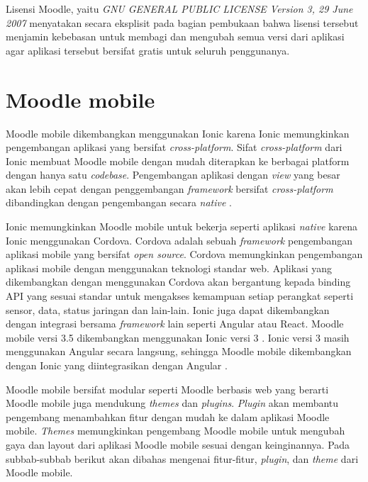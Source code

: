 Lisensi Moodle, yaitu \textit{GNU GENERAL PUBLIC LICENSE Version 3, 29 June 2007} menyatakan secara eksplisit pada bagian pembukaan bahwa lisensi tersebut menjamin kebebasan untuk membagi dan mengubah semua versi dari aplikasi agar aplikasi tersebut bersifat gratis untuk seluruh penggunanya\cite{GNU:preamble}.
\section{Moodle mobile}
\label{sec:Moodle mobile}
Moodle mobile dikembangkan menggunakan Ionic karena Ionic memungkinkan pengembangan aplikasi yang bersifat \textit{cross-platform}\cite{Ionic:intro}. Sifat \textit{cross-platform} dari Ionic membuat Moodle mobile dengan mudah diterapkan ke berbagai platform dengan hanya satu \textit{codebase}. Pengembangan aplikasi dengan \textit{view} yang besar akan lebih cepat dengan penggembangan \textit{framework} bersifat \textit{cross-platform} dibandingkan dengan pengembangan secara \textit{native} \cite{cross-platform}. 

Ionic memungkinkan Moodle mobile untuk bekerja seperti aplikasi \textit{native} karena Ionic menggunakan Cordova. Cordova adalah sebuah \textit{framework} pengembangan aplikasi mobile yang bersifat \textit{open source}. Cordova memungkinkan pengembangan aplikasi mobile dengan menggunakan teknologi standar web. Aplikasi yang dikembangkan dengan menggunakan Cordova akan bergantung kepada binding API yang sesuai standar untuk mengakses kemampuan setiap perangkat seperti sensor, data, status jaringan dan lain-lain\cite{cordova:overview}. Ionic juga dapat dikembangkan dengan integrasi bersama \textit{framework} lain seperti Angular atau React. Moodle mobile versi 3.5 dikembangkan menggunakan Ionic versi 3 \cite{moodle:dev}. Ionic versi 3 masih menggunakan Angular secara langsung, sehingga Moodle mobile dikembangkan dengan Ionic yang diintegrasikan dengan Angular \cite{moodle:dev}.


Moodle mobile bersifat modular seperti Moodle berbasis web yang berarti Moodle mobile juga mendukung \textit{themes} dan \textit{plugins}. \textit{Plugin} akan membantu pengembang menambahkan fitur dengan mudah ke dalam aplikasi Moodle mobile. \textit{Themes} memungkinkan pengembang Moodle mobile untuk mengubah gaya dan layout dari aplikasi Moodle mobile sesuai dengan keinginannya. Pada subbab-subbab berikut akan dibahas mengenai fitur-fitur, \textit{plugin}, dan \textit{theme} dari Moodle mobile.
